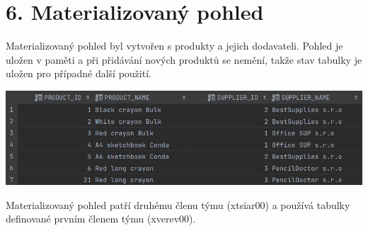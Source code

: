 \documentclass[12pt]{article}
\begin{document}
\newpage
\section*{6. Materializovaný pohled}
\indent Materializovaný pohled byl vytvořen s produkty a jejich dodavateli. Pohled je uložen v paměti a při přidávání nových produktů se nemění, takže stav tabulky je uložen pro případné další použití.
    
    \begin{center}
        \includegraphics[scale=0.4936]{9.png}
    \end{center}

    Materializovaný pohled patří druhému členu týmu (xtsiar00) a používá tabulky definované prvním členem týmu (xverev00).
\end{document}
